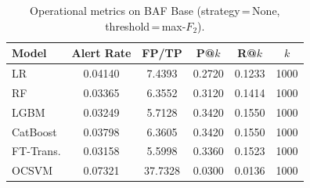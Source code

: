 \begin{table}[H]
\centering
\caption{Operational metrics on BAF Base (strategy\,=\,None, threshold\,=\,max-$F_2$).}
\label{tab:ops_baf}
\begin{tabular}{l c c c c c}
\toprule
Model & Alert Rate & FP/TP & P@$k$ & R@$k$ & $k$ \\
\midrule
LR         & 0.04140 & 7.4393 & 0.2720 & 0.1233 & 1000 \\
RF         & 0.03365 & 6.3552 & 0.3120 & 0.1414 & 1000 \\
LGBM       & 0.03249 & 5.7128 & 0.3420 & 0.1550 & 1000 \\
CatBoost   & 0.03798 & 6.3605 & 0.3420 & 0.1550 & 1000 \\
FT-Trans.  & 0.03158 & 5.5998 & 0.3360 & 0.1523 & 1000 \\
OCSVM      & 0.07321 & 37.7328 & 0.0300 & 0.0136 & 1000 \\
\bottomrule
\end{tabular}
\end{table}